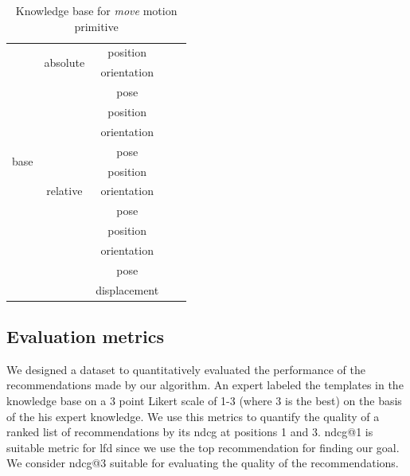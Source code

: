 \begin{table}[htdp]
\begin{center}
\begin{tabular}{|c|c|c|p{5cm}|p{5cm}|}
	 \multirow{12}{*}{base} & \multirow{2}{*}{absolute} & position & \TemplateF & \TemplateFDescription \\
\cline{3-5}
	 &  & orientation & \TemplateF & \TemplateFDescription\\
\cline{3-5}
	 &  & pose & \TemplateF & \TemplateFDescription\\
\cline{2-5}
	 & \multirow{9}{*}{relative} & position & \TemplateG & \TemplateGbDescription\\
\cline{3-5}
	 &  & orientation & \TemplateG & \TemplateGcDescription\\
\cline{3-5}
	 &  & pose & \TemplateG & \TemplateGaDescription\\
\cline{3-5}
	 &  & position & \TemplateH & \TemplateHbDescription\\
\cline{3-5}
	 &  & orientation & \TemplateH & \TemplateHcDescription\\
\cline{3-5}
	 &  & pose & \TemplateH & \TemplateHaDescription\\
\cline{3-5}
	 &  & position & \TemplateI & \TemplateIbDescription\\
\cline{3-5}
	 &  & orientation & \TemplateI & \TemplateIcDescription\\
\cline{3-5}
	 &  & pose & \TemplateI & \TemplateIaDescription\\

\cline{3-5}
	 &  & displacement & \TemplateF & \TemplateFDescription\\
\hline
\end{tabular}
\end{center}

\caption{Knowledge base for \textit{move} motion primitive}
\label{knowledge base}
\end{table}

\subsection{Evaluation metrics}
We designed a dataset to quantitatively evaluated the performance of the 
recommendations made by our algorithm. An expert labeled the templates in
the knowledge base on a 3 point Likert scale of 1-3 (where 3 is the best) 
on the basis of the his expert knowledge. We use this metrics to quantify 
the quality of a ranked list of recommendations by its \acrfull{ndcg} 
\cite{manning_introduction_2008} at positions 1 and 3.
\acrshort{ndcg}@1 is suitable metric for \acrshort{lfd} since we
use the top recommendation for finding our goal.
We consider \acrshort{ndcg}@3 suitable for evaluating the quality of the 
recommendations.

